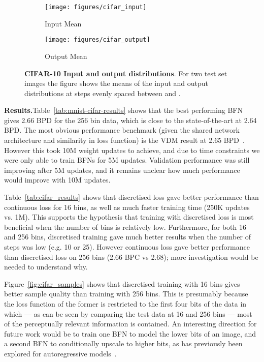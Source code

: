 \documentclass[11pt,table]{article}
\newcommand{\0}[1]{\constvec{0}{#1}}
\newcommand{\1}[1]{\constvec{1}{#1}}
\begin{document}
\begin{figure}[t!]
\centering
\begin{subfigure}{\textwidth}
    \centering
    \texttt{[image: figures/cifar\_input]}
    \caption{Input Mean}
\end{subfigure}
\par\bigskip
\begin{subfigure}{\textwidth}
    \centering
    \texttt{[image: figures/cifar\_output]}
    \caption{Output Mean}
\end{subfigure}
\caption{\textbf{CIFAR-10 Input and output distributions}. For two test set images the figure shows the means of the input and output distributions at steps evenly spaced between  and . }
\end{figure}

\noindent\textbf{Results.}\quad Table~\ref{tab:mnist-cifar-results} shows that the best performing BFN gives 2.66 BPD for the 256 bin data, which is close to the state-of-the-art at 2.64 BPD.
The most obvious performance benchmark (given the shared network architecture and similarity in loss function) is the VDM result at 2.65 BPD~\citep{kingma2021variational}.
However this took 10M weight updates to achieve, and due to time constraints we were only able to train BFNs for 5M updates.
Validation performance was still improving after 5M updates, and it remains unclear how much performance would improve with 10M updates.

Table~\ref{tab:cifar_results} shows that discretised loss gave better performance than continuous loss for 16 bins, as well as much faster training time (250K updates vs. 1M).
This supports the hypothesis that training with discretised loss is most beneficial when the number of bins is relatively low.
Furthermore, for both 16 and 256 bins, discretised training gave much better results when the number of steps  was low (e.g. 10 or 25).
However continuous loss gave better performance than discretised loss on 256 bins (2.66 BPC vs 2.68); more investigation would be needed to understand why.

Figure~\ref{fig:cifar_samples} shows that discretised training with 16 bins gives better sample quality than training with 256 bins.
This is presumably because the loss function of the former is restricted to the first four bits of the data in which --- as can be seen by comparing the test data at 16 and 256 bins --- most of the perceptually relevant information is contained.
An interesting direction for future work would be to train one BFN to model the lower bits of an image, and a second BFN to conditionally upscale to higher bits, as has previously been explored for autoregressive models~\citep{menick2018generating,hoogeboom2021autoregressive}.
\end{document}
